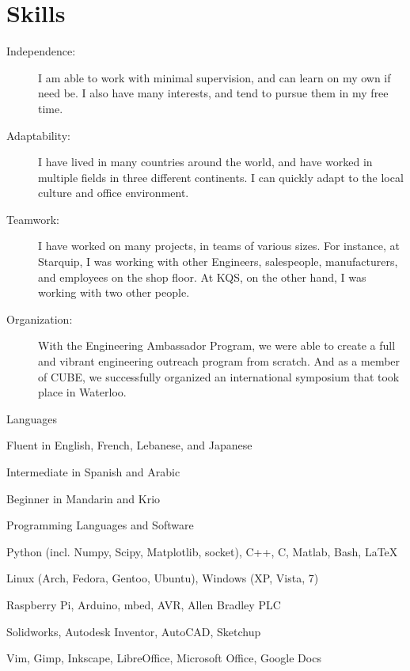 \documentclass[10pt, a4paper]{article}
\begin{document}
\section{Skills}
\begin{description}
  \item [Independence:] I am able to work with minimal supervision, and can learn on my own if need be. I also have many interests, and tend to pursue them in my free time.
  \item [Adaptability:] I have lived in many countries around the world, and have worked in multiple fields in three different continents. I can quickly adapt to the local culture and office environment.
  \item [Teamwork:] I have worked on many projects, in teams of various sizes. For instance, at Starquip, I was working with other Engineers, salespeople, manufacturers, and employees on the shop floor. At KQS, on the other hand, I was working with two other people.
  \item [Organization:] With the Engineering Ambassador Program, we were able to create a full and vibrant engineering outreach program from scratch. And as a member of CUBE, we successfully organized an international symposium that took place in Waterloo.
\end{description}

\halfblankline

Languages
\begin{innerlist}
  \item Fluent in English, French, Lebanese, and Japanese
  \item Intermediate in Spanish and Arabic
  \item Beginner in Mandarin and Krio
\end{innerlist}

\halfblankline

Programming Languages and Software
\begin{innerlist}
  \item Python (incl. Numpy, Scipy, Matplotlib, socket), C++, C, Matlab, Bash, \LaTeX
  \item Linux (Arch, Fedora, Gentoo, Ubuntu), Windows (XP, Vista, 7)
  \item Raspberry Pi, Arduino, mbed, AVR, Allen Bradley PLC
  \item Solidworks, Autodesk Inventor, AutoCAD, Sketchup
  \item Vim, Gimp, Inkscape, LibreOffice, Microsoft Office, Google Docs
\end{innerlist}
\end{document}
